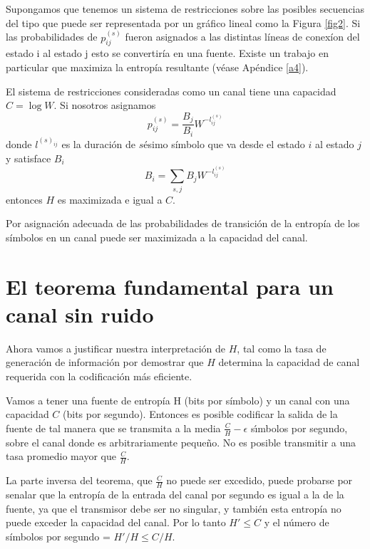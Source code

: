 Supongamos que tenemos un sistema de restricciones sobre las posibles
secuencias del tipo que puede ser representada por un gr\'afico lineal
como la Figura \ref{fig2}. Si las probabilidades de $p^{(s)}_{ij}$
fueron asignados a las distintas l\'ineas de conex\'ion del estado i
al estado j esto se convertir\'ia en una fuente.  Existe un trabajo en
particular que maximiza la entrop\'ia resultante (v\'ease Ap\'endice
\ref{a4}).

\begin{theorem}
El sistema de restricciones consideradas como un canal tiene una
capacidad $C=\log W$.  Si nosotros asignamos
\begin{equation}
p^{(s)}_{ij}=\frac{B_{j}}{B_{i}}W^{-l^{(s)}_{ij}}
\end{equation}
donde $l^{(s)_{ij}}$ es la duraci\'on de $s$\'{e}simo s\'imbolo que va
desde el estado $i$ al estado $j$ y satisface $B_{i}$
\begin{equation}
B_{i}=\sum_{s,j} B_{j}W^{-l^{(s)}_{ij}}
\end{equation}
entonces $H$ es maximizada e igual a $C$.
\end{theorem}

Por asignaci\'on adecuada de las probabilidades de transici\'on de la
entrop\'ia de los s\'imbolos en un canal puede ser maximizada a la
capacidad del canal.

\chapter{El teorema fundamental para un canal sin ruido}

Ahora vamos a justificar nuestra interpretaci\'on de $H$, tal como la
tasa de generaci\'on de informaci\'on por demostrar que $H$ determina la
capacidad de canal requerida con la codificaci\'on m\'as eficiente.

\begin{theorem}
Vamos a tener una fuente de entrop\'ia H (bits por s\'imbolo) y un
canal con una capacidad $C$ (bits por segundo). Entonces es posible
codificar la salida de la fuente de tal manera que se transmita a la
media $\frac{C}{H}-\epsilon$ s\'{\i}mbolos por segundo, sobre el canal
donde es arbitrariamente peque\~{n}o. No es posible transmitir a una
tasa promedio mayor que $\frac{C}{H}$.
\label{t9}
\end{theorem}

La parte inversa del teorema, que $\frac{C}{H}$ no puede ser excedido,
puede probarse por senalar que la entrop\'ia de la entrada del canal
por segundo es igual a la de la fuente, ya que el transmisor debe ser
no singular, y tambi\'en esta entrop\'ia no puede exceder la capacidad
del canal. Por lo tanto $H' \leq C$ y el n\'umero de
s\'imbolos por segundo = $H'/ H \leq C/H$. 

